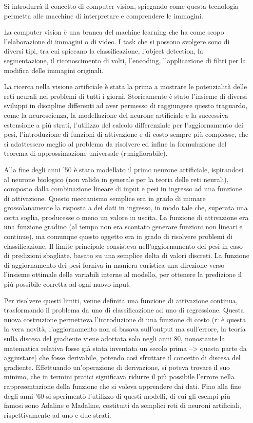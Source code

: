 Si introdurrà il concetto di computer vision, spiegando come questa tecnologia permetta alle macchine di interpretare e comprendere le immagini. 

\noindent La computer vision è una branca del machine learning che ha come scopo l'elaborazione di immagini o di video. I task che si possono svolgere sono di diversi tipi, tra cui spiccano la classificazione, l'object detection, la segmentazione, il riconoscimento di volti, l'encoding, l'applicazione di filtri per la modifica delle immagini originali.

La ricerca nella visione artificiale è stata la prima a mostrare le potenzialità delle reti neurali nei problemi di tutti i giorni. Storicamente è stato l'insieme di diversi sviluppi in discipline differenti ad aver permesso di raggiungere questo traguardo, come la neuroscienza, la modellazione del neurone artificiale e la successiva estensione a più strati, l'utilizzo del calcolo differenziale per l'aggiornamento dei pesi, l'introduzione di funzioni di attivazione e di costo sempre più complesse, che si adattessero meglio al problema da risolvere ed infine la formulazione del teorema di approssimazione universale (r:migliorabile). 

Alla fine degli anni '50 è stato modellato il primo neurone artificiale, ispirandosi al neurone biologico (non valido in generale per la teoria delle reti neurali), composto dalla combinazione lineare di input e pesi in ingresso ad una funzione di attivazione. Questo meccanismo semplice era in grado di mimare grossolanamente la risposta a dei dati in ingresso, in modo tale che, superata una certa soglia, producesse o meno un valore in uscita. La funzione di attivazione era una funzione gradino (al tempo non era scontato generare funzioni non lineari e continue), ma comunque questo oggetto era in grado di risolvere problemi di classificazione. Il limite principale consisteva nell'aggiornamento dei pesi in caso di predizioni sbagliate, basato su una semplice delta di valori discreti. La funzione di aggiornamento dei pesi forniva in maniera euristica una direzione verso l'insieme ottimale delle variabili interne al modello, per ottenere la predizione il più possibile corretta ad ogni nuovo input. 

Per risolvere questi limiti, venne definita una funzione di attivazione continua, trasformando il problema da uno di classificazione ad uno di regressione. Questa nuova costruzione permetteva l'introduzione di una funzione di costo (r: è questa la vera novità, l'aggiornamento non si basava sull'output ma sull'errore, la teoria sulla discesa del gradiente viene adottata solo negli anni 80, nonostante la matematica relativa fosse già stata inventata un secolo prima --> questa parte da aggiustare) che fosse derivabile, potendo così sfruttare il concetto di discesa del gradiente. Effettuando un'operazione di derivazione, si poteva trovare il suo minimo, che in termini pratici significava ridurre il più possibile l'errore nella rappresentazione della funzione che si voleva apprendere dai dati. Fino alla fine degli anni '60 si sperimentò l'utilizzo di questi modelli, di cui gli esempi più famosi sono Adaline e Madaline, costituiti da semplici reti di neuroni artificiali, rispettivamente ad uno e due strati. 

